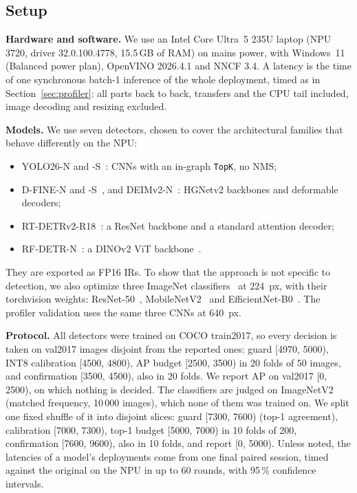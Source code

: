 \documentclass[conference]{IEEEtran}
\begin{document}
\subsection{Setup}

\textbf{Hardware and software.} We use an Intel Core Ultra~5 235U laptop (NPU 3720, driver 32.0.100.4778, 15.5\,GB of RAM) on mains power, with Windows~11 (Balanced power plan), OpenVINO 2026.4.1 and NNCF 3.4. A latency is the time of one synchronous batch-1 inference of the whole deployment, timed as in Section~\ref{sec:profiler}: all parts back to back, transfers and the CPU tail included, image decoding and resizing excluded.

\textbf{Models.} We use seven detectors, chosen to cover the architectural families that behave differently on the NPU:
\begin{itemize}
\item YOLO26-N and -S~\cite{jocher2026yolo26}: CNNs with an in-graph \texttt{TopK}, no NMS;
\item D-FINE-N and -S~\cite{peng2025dfine}, and DEIMv2-N~\cite{huang2025deimv2}: HGNetv2 backbones and deformable decoders;
\item RT-DETRv2-R18~\cite{lv2024rtdetrv2}: a ResNet backbone and a standard attention decoder;
\item RF-DETR-N~\cite{robinson2026rfdetr}: a DINOv2 ViT backbone~\cite{oquab2024dinov2}.
\end{itemize}
They are exported as FP16 IRs. To show that the approach is not specific to detection, we also optimize three ImageNet classifiers~\cite{russakovsky2015imagenet} at 224~px, with their torchvision weights: ResNet-50~\cite{he2016resnet}, MobileNetV2~\cite{sandler2018mobilenetv2} and EfficientNet-B0~\cite{tan2019efficientnet}. The profiler validation uses the same three CNNs at 640~px.

\textbf{Protocol.} All detectors were trained on COCO train2017, so every decision is taken on val2017 images disjoint from the reported ones: guard [4970, 5000), INT8 calibration [4500, 4800), AP budget [2500, 3500) in 20 folds of 50 images, and confirmation [3500, 4500), also in 20 folds. We report AP on val2017 [0, 2500), on which nothing is decided. The classifiers are judged on ImageNetV2~\cite{recht2019imagenetv2} (matched frequency, 10\,000 images), which none of them was trained on. We split one fixed shuffle of it into disjoint slices: guard [7300, 7600) (top-1 agreement), calibration [7000, 7300), top-1 budget [5000, 7000) in 10 folds of 200, confirmation [7600, 9600), also in 10 folds, and report [0, 5000). Unless noted, the latencies of a model's deployments come from one final paired session, timed against the original on the NPU in up to 60 rounds, with 95\,\% confidence intervals.
\end{document}
